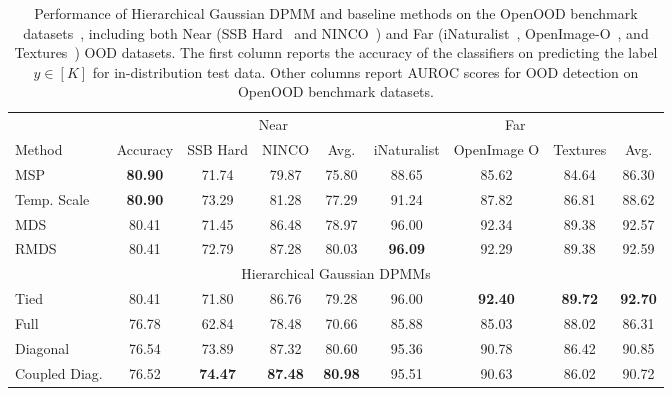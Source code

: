 \begin{table*}[!ht]
\caption{Performance of Hierarchical Gaussian DPMM and baseline methods on the OpenOOD benchmark datasets~\cite{yang2022openood,zhang23openood15}, including both Near (SSB Hard~\citep{vaze22ssb} and NINCO~\citep{bitterwolf2023ninco}) and Far (iNaturalist~\citep{inaturalist}, OpenImage-O~\citep{openimageo}, and Textures~\citep{textures}) OOD datasets. The first column reports the accuracy of the classifiers on predicting the label $y \in [K]$ for in-distribution test data. Other columns report AUROC scores for OOD detection on OpenOOD benchmark datasets.
}
\label{tab:openood-main}
\begin{small}
\begin{center}
\begin{tabular}{lcccccccc}
\toprule
 & & \multicolumn{3}{c}{Near} & \multicolumn{4}{c}{Far} \\
\cmidrule(lr){3-5}\cmidrule(lr){6-9}
Method & Accuracy & SSB Hard & NINCO & Avg. & iNaturalist & OpenImage O & Textures & Avg. \\
\midrule
MSP & \textbf{80.90} & 71.74 & 79.87 & 75.80 & 88.65 & 85.62 & 84.64 & 86.30 \\
Temp. Scale & \textbf{80.90} & 73.29 & 81.28 & 77.29 & 91.24 & 87.82 & 86.81 & 88.62 \\
MDS & 80.41 & 71.45 & 86.48 & 78.97 & 96.00 & 92.34 & 89.38 & 92.57 \\
RMDS & 80.41 & 72.79 & 87.28 & 80.03 & \textbf{96.09} & 92.29 & 89.38 & 92.59 \\
\midrule
\multicolumn{9}{c}{Hierarchical Gaussian DPMMs}\\
\midrule
Tied & 80.41 & 71.80 & 86.76 & 79.28 & 96.00 & \textbf{92.40} & \textbf{89.72} & \textbf{92.70} \\
Full & 76.78 & 62.84 & 78.48 & 70.66 & 85.88 & 85.03 & 88.02 & 86.31 \\
Diagonal & 76.54 & 73.89 & 87.32 & 80.60 & 95.36 & 90.78 & 86.42 & 90.85 \\
Coupled Diag. & 76.52 & \textbf{74.47} & \textbf{87.48} & \textbf{80.98} & 95.51 & 90.63 & 86.02 & 90.72 \\
\bottomrule
\end{tabular}
\end{center}
\end{small}
\end{table*}
